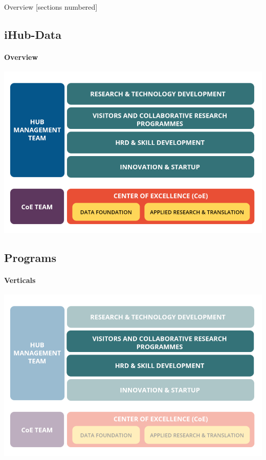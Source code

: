 \titleframe

\begin{frame}{Overview}
  [sections numbered]
  \tableofcontents[hideallsubsections]
\end{frame}


\subsection{iHub-Data}
\begin{frame}{\insertsubsectionhead}
  \framesubtitle{Overview}
  \includegraphics[scale=0.3]{images/overview.png}
\end{frame}

\subsection{Programs}
\begin{frame}{\insertsubsectionhead}
  \framesubtitle{Verticals}
  \includegraphics[scale=0.3]{images/overview-1.png}
\end{frame}

